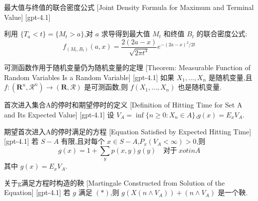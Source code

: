 \documentclass[UTF8]{ctexart}
\begin{document}
    
    
    \begin{thm}
        {最大值与终值的联合密度公式}
        [Joint Density Formula for Maximum and Terminal Value]
        [gpt-4.1]
        
利用 $\{ T_{a} < t \} = \{ M_{t} > a \}$,对 $a$ 求导得到最大值 $M_{t}$ 和终值 $B_{t}$ 的联合密度公式:
\[
f_{( M_{t}, B_{t} )}( a, x ) = \frac{ 2 ( 2a - x ) }{ \sqrt{ 2 \pi t^{3} } } e^{ - ( 2a - x )^{2} / 2t }
\]

    \end{thm}
    
    
    
    \begin{thm}
        {可测函数作用于随机变量仍为随机变量的定理}
        [Theorem: Measurable Function of Random Variables Is a Random Variable]
        [gpt-4.1]
        如果 $X_{1}, \dots, X_{n}$ 是随机变量,且 $f : (\mathbf{R}^{n}, \mathcal{R}^{n}) \to (\mathbf{R}, \mathcal{R})$ 是可测函数,则 $f(X_{1}, \dots, X_{n})$ 也是随机变量.
    \end{thm}
    
    
    
    \begin{dfn}
        {首次进入集合A的停时和期望停时的定义}
        [Definition of Hitting Time for Set A and Its Expected Value]
        [gpt-4.1]
        设 $V_{A} = \operatorname*{inf} \{n \geq 0 : X_{n} \in A\}$,$g(x) = E_{x} V_{A}$.
    \end{dfn}
    
    
    
    \begin{thm}
        {期望首次进入A的停时满足的方程}
        [Equation Satisfied by Expected Hitting Time]
        [gpt-4.1]
        若 $S - A$ 有限,且对每个 $x \in S - A$,$P_{x}(V_{A} < \infty) > 0$,则
\[
g(x) = 1 + \sum_{y} p(x, y) g(y) \quad \text{对于}~ x 
otin A
\]
其中 $g(x) = E_x V_A$.
    \end{thm}
    
    
    
    \begin{thm}
        {关于g满足方程时构造的鞅}
        [Martingale Constructed from Solution of the Equation]
        [gpt-4.1]
        若 $g$ 满足 $(*)$,则 $g(X(n \land V_A)) + (n \land V_A)$ 是一个鞅.
    \end{thm}
    
\end{document}
